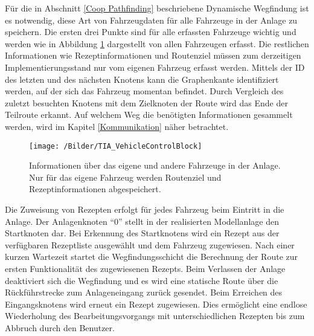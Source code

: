 			Für die in Abschnitt \ref{Coop Pathfinding} beschriebene Dynamische Wegfindung ist es notwendig, diese Art von Fahrzeugdaten für alle Fahrzeuge in der Anlage zu speichern. Die ersten drei Punkte sind für alle erfassten Fahrzeuge wichtig und werden wie in Abbildung \ref{VehicleControlBlock} dargestellt von allen Fahrzeugen erfasst. Die restlichen Informationen wie Rezeptinformationen und Routenziel müssen zum derzeitigen Implementierungsstand nur vom eigenen Fahrzeug erfasst werden. Mittels der ID des letzten und des nächsten Knotens kann die Graphenkante identifiziert werden, auf der sich das Fahrzeug momentan befindet. Durch Vergleich des zuletzt besuchten Knotens mit dem Zielknoten der Route wird das Ende der Teilroute erkannt. Auf welchem Weg die benötigten Informationen gesammelt werden, wird im  Kapitel \ref{Kommunikation} näher betrachtet.
			
			\begin{figure}[h]
				\centering
				\texttt{[image: /Bilder/TIA\_VehicleControlBlock]}
				\vspace{0.2cm}
				\caption{Informationen über das eigene und andere Fahrzeuge in der Anlage. Nur für das eigene Fahrzeug werden Routenziel und Rezeptinformationen abgespeichert.}\label{VehicleControlBlock}
			\end{figure}
			Die Zuweisung von Rezepten erfolgt für jedes Fahrzeug beim Eintritt in die Anlage. Der Anlagenknoten "`0"' stellt in der realisierten Modellanlage den Startknoten dar. Bei Erkennung des Startknotens wird ein Rezept aus der verfügbaren Rezeptliste ausgewählt und dem Fahrzeug zugewiesen. Nach einer kurzen Wartezeit startet die Wegfindungsschicht die Berechnung der Route zur ersten Funktionalität des zugewiesenen Rezepts. Beim Verlassen der Anlage deaktiviert sich die Wegfindung und es wird eine statische Route über die Rückführstrecke zum Anlageneingang zurück gesendet. Beim Erreichen des Eingangsknotens wird erneut ein Rezept zugewiesen. Dies ermöglicht eine endlose Wiederholung des Bearbeitungsvorgangs  mit unterschiedlichen Rezepten bis zum Abbruch durch den Benutzer.
			
		
